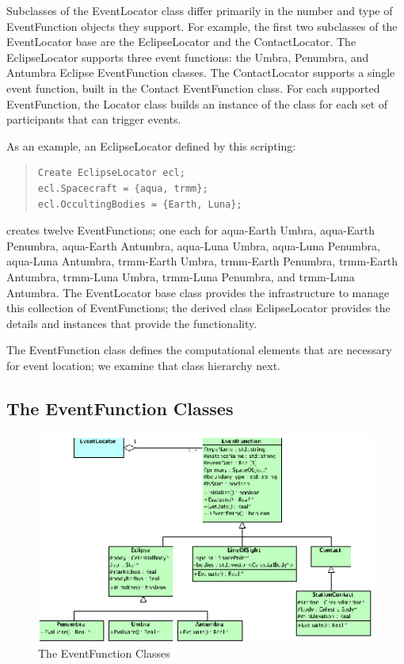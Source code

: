 \documentclass[letterpaper,10pt]{article}
\begin{document}
Subclasses of the EventLocator class differ primarily in the number and type of
EventFunction objects they support.  For example, the first two subclasses of
the EventLocator base are the EclipseLocator and the ContactLocator.  The
EclipseLocator supports three event functions: the Umbra, Penumbra, and
Antumbra Eclipse EventFunction classes.  The ContactLocator supports a single
event function, built in the Contact EventFunction class.  For each supported
EventFunction, the Locator class builds an instance of the class for each set
of participants that can trigger events.  

As an example, an EclipseLocator defined by this scripting:

\begin{quote}
\begin{verbatim}
Create EclipseLocator ecl;
ecl.Spacecraft = {aqua, trmm};
ecl.OccultingBodies = {Earth, Luna};
\end{verbatim}
\end{quote}

\noindent creates twelve EventFunctions; one each for aqua-Earth Umbra,
aqua-Earth Penumbra, aqua-Earth Antumbra, aqua-Luna Umbra, aqua-Luna Penumbra,
aqua-Luna Antumbra, trmm-Earth Umbra, trmm-Earth Penumbra, trmm-Earth Antumbra,
trmm-Luna Umbra, trmm-Luna Penumbra, and trmm-Luna Antumbra.  The EventLocator
base class provides the infrastructure to manage this collection of
EventFunctions; the derived class EclipseLocator provides the details and
instances that provide the functionality.

The EventFunction class defines the computational elements that are necessary
for event location; we examine that class hierarchy next.

\subsection{The EventFunction Classes}

\begin{figure}[ht]
\begin{center}
\includegraphics[scale=1.7]{./Images/EventFunction.eps}
\caption{\label{fig:EventFunction}The EventFunction Classes}
\end{center}
\end{figure} 
\end{document}
